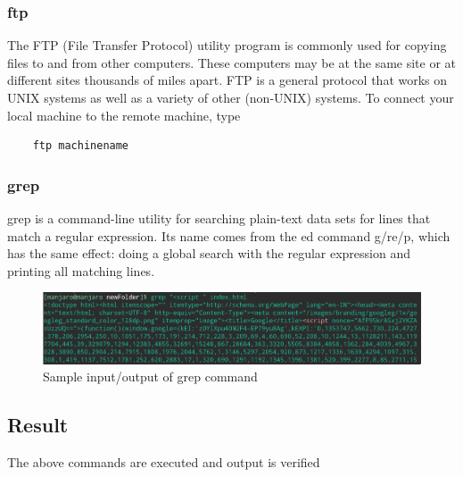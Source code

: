 \documentclass{article}
\begin{document}
\subsubsection{ftp}
The FTP (File Transfer Protocol) utility program is commonly used for copying files
to and from other computers. These computers may be at the same site or at different
sites thousands of miles apart. FTP is a general protocol that works on UNIX systems
as well as a variety of other (non-UNIX) systems. To connect your local machine to the remote machine, type
\begin{verbatim}
    ftp machinename
\end{verbatim}

\subsubsection{grep}
grep is a command-line utility for searching plain-text data sets for lines that match a regular expression. Its name comes from the ed command g/re/p, which has the same effect: doing a global search with the regular expression and printing all matching lines.
\begin{figure}[h!]
    \centering
    \includegraphics[width=.83\textwidth]{img/p3/ss3.png}
    \caption{Sample input/output of grep command}
\end{figure}

\subsection{Result}
The above commands are executed and output is verified
\end{document}
